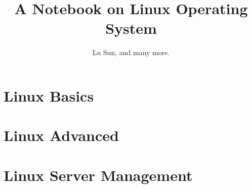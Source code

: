 \documentclass[krantz1,ChapterTOCs]{krantz}
\begin{document}
\frontmatter

\title{A Notebook on Linux Operating System}
\author{Lu Sun, and many more.}

\maketitle


\tableofcontents


\listoffigures
\listoftables
%
%

\mainmatter

\part{Linux Basics}













\part{Linux Advanced}









\part{Linux Server Management}

\end{document}
